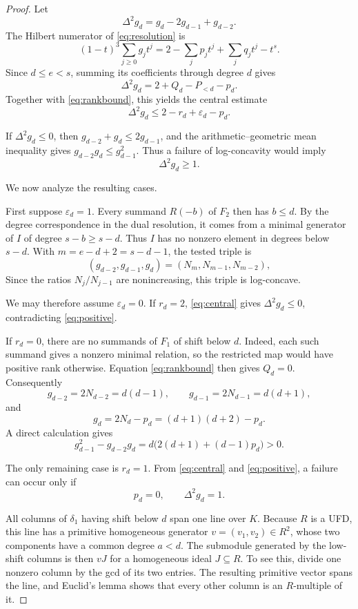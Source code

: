 \documentclass[11pt]{article}
\begin{document}
\begin{proof}
Let
\[
  \Delta^2g_d=g_d-2g_{d-1}+g_{d-2}.
\]
The Hilbert numerator of \eqref{eq:resolution} is
\[
  (1-t)^3\sum_{j\geq0}g_jt^j
  =
  2-\sum_jp_jt^j+\sum_jq_jt^j-t^s.
\]
Since $d\leq e<s$, summing its coefficients through degree $d$ gives
\[
  \Delta^2g_d=2+Q_d-P_{<d}-p_d.
\]
Together with \eqref{eq:rankbound}, this yields the central estimate
\begin{equation}
\label{eq:central}
  \Delta^2g_d\leq
  2-r_d+\varepsilon_d-p_d.
\end{equation}

If $\Delta^2g_d\leq0$, then
$g_{d-2}+g_d\leq2g_{d-1}$, and the arithmetic--geometric mean
inequality gives
$g_{d-2}g_d\leq g_{d-1}^2$.  Thus a failure of log-concavity
would imply
\begin{equation}
\label{eq:positive}
  \Delta^2g_d\geq1.
\end{equation}

We now analyze the resulting cases.

First suppose $\varepsilon_d=1$.  Every summand $R(-b)$ of $F_2$
then has $b\leq d$.  By the degree correspondence in the dual
resolution, it comes from a minimal generator of $I$ of degree
$s-b\geq s-d$.  Thus $I$ has no nonzero element in degrees below
$s-d$.  With $m=e-d+2=s-d-1$, the tested triple is
\[
  (g_{d-2},g_{d-1},g_d)
  =(N_m,N_{m-1},N_{m-2}),
\]
Since the ratios $N_j/N_{j-1}$ are nonincreasing, this triple is
log-concave.

We may therefore assume $\varepsilon_d=0$.  If $r_d=2$,
\eqref{eq:central} gives $\Delta^2g_d\leq0$, contradicting
\eqref{eq:positive}.

If $r_d=0$, there are no summands of $F_1$ of shift below $d$.
Indeed, each such summand gives a nonzero minimal relation, so the
restricted map would have positive rank otherwise.  Equation
\eqref{eq:rankbound} then gives $Q_d=0$.  Consequently
\[
  g_{d-2}=2N_{d-2}=d(d-1),\qquad
  g_{d-1}=2N_{d-1}=d(d+1),
\]
and
\[
  g_d=2N_d-p_d=(d+1)(d+2)-p_d.
\]
A direct calculation gives
\[
  g_{d-1}^2-g_{d-2}g_d
  =
  d\bigl(2(d+1)+(d-1)p_d\bigr)>0.
\]

The only remaining case is $r_d=1$.  From
\eqref{eq:central} and \eqref{eq:positive}, a failure can occur only
if
\begin{equation}
\label{eq:hard}
  p_d=0,
  \qquad
  \Delta^2g_d=1.
\end{equation}

All columns of $\delta_1$ having shift below $d$ span one line over
$K$.  Because $R$ is a UFD, this line has a primitive homogeneous
generator $v=(v_1,v_2)\in R^2$, whose two components have a common
degree $a<d$.  The submodule generated by the low-shift columns is
then $vJ$ for a homogeneous ideal $J\subseteq R$.  To see this,
divide one nonzero column by the gcd of its two entries.  The resulting
primitive vector spans the line, and Euclid's lemma shows that every
other column is an $R$-multiple of it.


\end{proof}
\end{document}
